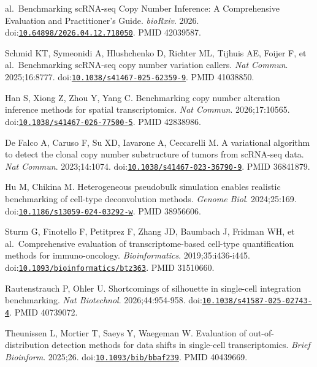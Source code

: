 \documentclass[11pt]{article}
\begin{document}
\begin{enumerate}[label={[\arabic*]},leftmargin=2.6em,labelsep=0.5em,itemsep=1.5pt]
  al.~Benchmarking scRNA-seq Copy Number Inference: A Comprehensive
  Evaluation and Practitioner's Guide. \emph{bioRxiv}. 2026.
  doi:\href{https://doi.org/10.64898/2026.04.12.718050}{\nolinkurl{10.64898/2026.04.12.718050}}.
  PMID 42039587.
\item
  Schmid KT, Symeonidi A, Hlushchenko D, Richter ML, Tijhuis AE, Foijer
  F, et al.~Benchmarking scRNA-seq copy number variation callers.
  \emph{Nat Commun}. 2025;16:8777.
  doi:\href{https://doi.org/10.1038/s41467-025-62359-9}{\nolinkurl{10.1038/s41467-025-62359-9}}.
  PMID 41038850.
\item
  Han S, Xiong Z, Zhou Y, Yang C. Benchmarking copy number alteration
  inference methods for spatial transcriptomics. \emph{Nat Commun}.
  2026;17:10565.
  doi:\href{https://doi.org/10.1038/s41467-026-77500-5}{\nolinkurl{10.1038/s41467-026-77500-5}}.
  PMID 42838986.
\item
  De Falco A, Caruso F, Su XD, Iavarone A, Ceccarelli M. A variational
  algorithm to detect the clonal copy number substructure of tumors from
  scRNA-seq data. \emph{Nat Commun}. 2023;14:1074.
  doi:\href{https://doi.org/10.1038/s41467-023-36790-9}{\nolinkurl{10.1038/s41467-023-36790-9}}.
  PMID 36841879.
\item
  Hu M, Chikina M. Heterogeneous pseudobulk simulation enables realistic
  benchmarking of cell-type deconvolution methods. \emph{Genome Biol}.
  2024;25:169.
  doi:\href{https://doi.org/10.1186/s13059-024-03292-w}{\nolinkurl{10.1186/s13059-024-03292-w}}.
  PMID 38956606.
\item
  Sturm G, Finotello F, Petitprez F, Zhang JD, Baumbach J, Fridman WH,
  et al.~Comprehensive evaluation of transcriptome-based cell-type
  quantification methods for immuno-oncology. \emph{Bioinformatics}.
  2019;35:i436-i445.
  doi:\href{https://doi.org/10.1093/bioinformatics/btz363}{\nolinkurl{10.1093/bioinformatics/btz363}}.
  PMID 31510660.
\item
  Rautenstrauch P, Ohler U. Shortcomings of silhouette in single-cell
  integration benchmarking. \emph{Nat Biotechnol}. 2026;44:954-958.
  doi:\href{https://doi.org/10.1038/s41587-025-02743-4}{\nolinkurl{10.1038/s41587-025-02743-4}}.
  PMID 40739072.
\item
  Theunissen L, Mortier T, Saeys Y, Waegeman W. Evaluation of
  out-of-distribution detection methods for data shifts in single-cell
  transcriptomics. \emph{Brief Bioinform}. 2025;26.
  doi:\href{https://doi.org/10.1093/bib/bbaf239}{\nolinkurl{10.1093/bib/bbaf239}}.
  PMID 40439669.
\item

\end{enumerate}
\end{document}
